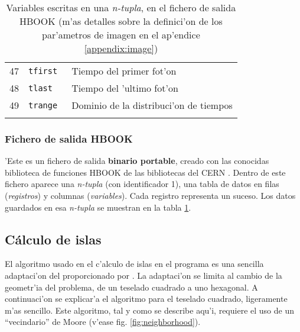 \begin{table}[htbp]
\begin{tabular}{|rll|}
 47 & \texttt{tfirst } & Tiempo del primer fot'on  \\
 48 & \texttt{tlast  } & Tiempo del 'ultimo fot'on \\
 49 & \texttt{trange } & Dominio de la distribuci'on de tiempos \\
 \hline
 \multicolumn{3}{c}{} \\
  \end{tabular}
  \caption{Variables escritas en una \emph{n-tupla}, en el fichero de
    salida HBOOK (m'as detalles sobre la definici'on de los
    par'ametros de imagen en el ap'endice \ref{appendix:image})}
  \label{tab:hbookntuple}
\end{table}

\subsubsection*{Fichero de salida HBOOK}

'Este es un fichero de salida \textbf{binario portable}, creado con las
conocidas biblioteca de funciones HBOOK de las bibliotecas del CERN
\cite{CERNlib}.  Dentro de este fichero aparece una  \emph{n-tupla}
(con identificador 1), una tabla de datos en filas (\emph{registros})
y columnas (\emph{variables}).  Cada registro representa un
suceso. Los datos guardados en esa \emph{n-tupla} se muestran en la
tabla \ref{tab:hbookntuple}.

\subsection{C\'alculo de islas}
\label{ssec:islands}

El algoritmo usado en el c'alculo de islas en el programa \camera es
una sencilla adaptaci'on del proporcionado por \cite{Fabero:islas}. La
adaptaci'on se limita al cambio de la geometr'ia del problema, de un
teselado cuadrado a uno hexagonal.  A continuaci'on se explicar'a el
algoritmo para el teselado cuadrado, ligeramente m'as sencillo.  Este
algoritmo, tal y como se describe aqu'i, requiere el uso de un
``vecindario'' de Moore (v'ease fig. \ref{fig:neighborhood}).

